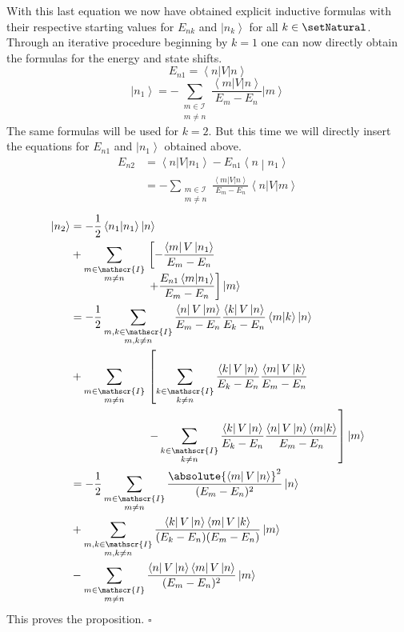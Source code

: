 \documentclass[10pt,fleqn]{article}
\newcommand{\bra}[1]{\left\langle #1 \right\vert}
\newcommand{\ket}[1]{\left\vert #1 \right\rangle}
\newcommand{\bracket}[2]{\left\langle #1 \middle\vert #2 \right\rangle}
\begin{document}
\begin{multicols}{2}
      With this last equation we now have obtained explicit inductive formulas with their respective starting values for $E_{nk}$ and $\ket{n_k}$ for all $k\in\setNatural$.
      Through an iterative procedure beginning by $k=1$ one can now directly obtain the formulas for the energy and state shifts.
      \[
        E_{n1} = \bra{n}V\ket{n}
      \]
      \[
        \ket{n_1} = - \sum_{\substack{m\in\mathscr{I} \\ m\neq n}} \frac{\bra{m}V\ket{n}}{E_m-E_n} \ket{m}
      \]
      The same formulas will be used for $k=2$.
      But this time we will directly insert the equations for $E_{n1}$ and $\ket{n_1}$ obtained above.
      \begin{align*}
        E_{n2}
        &= \bra{n}V\ket{n_1} - E_{n1}\bracket{n}{n_1} \\
        &= -\sum_{\substack{m\in\mathscr{I} \\ m\neq n}} \frac{\bra{m}V\ket{n}}{E_m-E_n} \bra{n}V\ket{m}
      \end{align*}
      \begin{align*}
        \ket{n_2}
        &= -\frac{1}{2} \bracket{n_1}{n_{1}}\ket{n} \\
        &+ \sum_{\substack{m\in\mathscr{I}\\m\neq n}}
          \begin{aligned}[t]
            &\left[ -\frac{\bra{m}V\ket{n_{1}}}{E_m-E_n} \right. \\
            &\left. + \frac{E_{n1}\bracket{m}{n_{1}}}{E_m - E_n} \right] \ket{m}
          \end{aligned}
        \\
        &= -\frac{1}{2} \sum_{\substack{m,k\in\mathscr{I}\\m,k\neq n}} \frac{\bra{n}V\ket{m}}{E_m-E_n} \frac{\bra{k}V\ket{n}}{E_k-E_n} \bracket{m}{k} \ket{n} \\
        &+ \sum_{\substack{m\in\mathscr{I}\\m\neq n}}
          \begin{aligned}[t]
            &\left[ \sum_{\substack{k\in\mathscr{I} \\ k\neq n}} \frac{\bra{k}V\ket{n}}{E_k-E_n} \frac{\bra{m}V\ket{k}}{E_m-E_n} \right. \\
            &\left. - \sum_{\substack{k\in\mathscr{I} \\ k\neq n}} \frac{\bra{k}V\ket{n}}{E_k-E_n} \frac{\bra{n}V\ket{n} \bracket{m}{k}}{E_m - E_n} \right] \ket{m}
          \end{aligned}
        \\
        &= -\frac{1}{2} \sum_{\substack{m\in\mathscr{I}\\m\neq n}} \frac{\absolute{\bra{m}V\ket{n}}^2}{(E_m-E_n)^2} \ket{n} \\
        &+ \sum_{\substack{m,k\in\mathscr{I}\\m,k\neq n}} \frac{\bra{k}V\ket{n} \bra{m}V\ket{k}}{(E_k-E_n)(E_m-E_n)} \ket{m} \\
        &- \sum_{\substack{m\in\mathscr{I}\\m\neq n}} \frac{\bra{n}V\ket{n} \bra{m}V\ket{n}}{(E_m-E_n)^2} \ket{m}
      \end{align*}
      This proves the proposition.
      \hfill$\square{}$
    \end{multicols}
\end{document}

